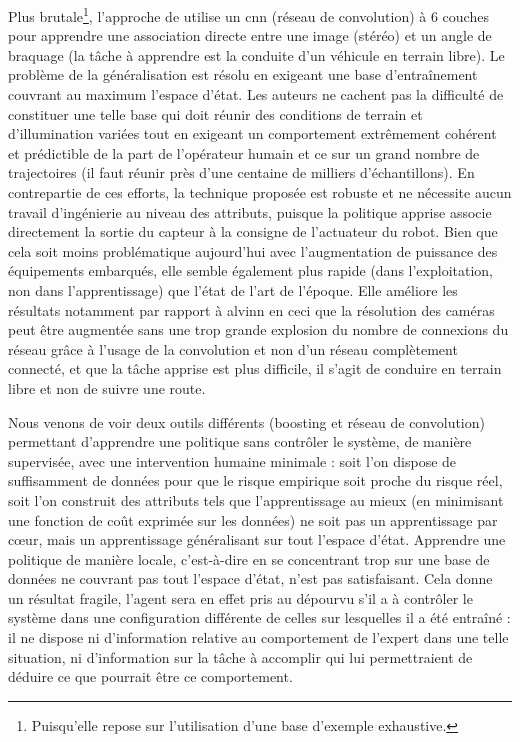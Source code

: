 \documentclass[frenchb,a4paper,justified,notoc]{tufte-book}
\begin{document}
Plus brutale\footnote{Puisqu'elle repose sur l'utilisation d'une base d'exemple exhaustive.
 }, l'approche de \citet{lecun2006off} utilise un \gls{cnn} (réseau de convolution) à 6 couches pour apprendre une association directe entre une image (stéréo) et un angle de braquage (la tâche à apprendre est la conduite d'un véhicule en terrain libre). Le problème de la généralisation est résolu en exigeant une base d'entraînement couvrant au maximum l'espace d'état. Les auteurs ne cachent pas la difficulté de constituer une telle base qui doit réunir des conditions de terrain et d'illumination variées tout en exigeant un comportement extrêmement cohérent et prédictible de la part de l'opérateur humain et ce sur un grand nombre de trajectoires (il faut réunir près d'une centaine de milliers d'échantillons). En contrepartie de ces efforts, la technique proposée est robuste et ne nécessite aucun travail d'ingénierie au niveau des attributs, puisque la politique apprise associe directement la sortie du capteur à la consigne de l'actuateur du robot. Bien que cela soit moins problématique aujourd'hui avec l'augmentation de puissance des équipements embarqués, elle semble également plus rapide (dans l'exploitation, non dans l'apprentissage) que l'état de l'art de l'époque. Elle améliore les résultats notamment par rapport à \gls{alvinn} \citep{pomerleau1993knowledge} en ceci que la résolution des caméras peut être augmentée sans une trop grande explosion du nombre de connexions du réseau grâce à l'usage de la convolution et non d'un réseau complètement connecté, et que la tâche apprise est plus difficile, il s'agit de conduire en terrain libre et non de suivre une route.

Nous venons de voir deux outils différents (\gls{boosting} et réseau de convolution) permettant d'apprendre une politique sans contrôler le système, de manière supervisée, avec une intervention humaine minimale : soit l'on dispose de suffisamment de données pour que le risque empirique soit proche du risque réel, soit l'on construit des attributs tels que l'apprentissage au mieux (en minimisant une fonction de coût exprimée sur les données) ne soit pas un apprentissage par cœur, mais un apprentissage généralisant sur tout l'espace d'état. Apprendre une politique de manière locale, c'est-à-dire en se concentrant trop sur une base de données ne couvrant pas tout l'espace d'état, n'est pas satisfaisant. Cela donne un résultat fragile, l'agent sera en effet pris au dépourvu s'il a à contrôler le système dans une configuration différente de celles sur lesquelles il a été entraîné : il ne dispose ni d'information relative au comportement de l'expert dans une telle situation, ni d'information sur la tâche à accomplir qui lui permettraient de déduire ce que pourrait être ce comportement.
\end{document}
